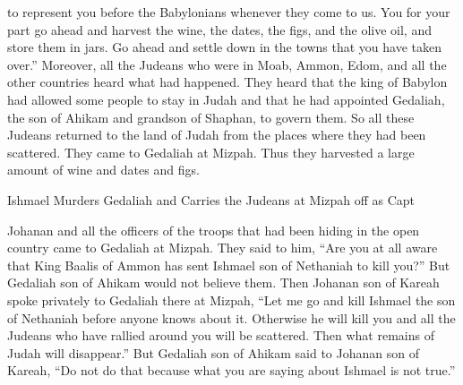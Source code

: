 {to represent
you before
the Babylonians
whenever they come
to
us. You
for your part go ahead and harvest
the wine,
the dates, the figs, and the olive oil,
and store
them in jars.
Go ahead and settle down
in the towns
that
you have taken over.”
Moreover,
all
the Judeans
who
were in Moab,
Ammon,
Edom,
and all
the other countries
heard
what had happened.
They heard that
the king
of Babylon
had allowed
some people
to stay
in Judah
and that
he had appointed
Gedaliah,
the son
of Ahikam
and grandson
of Shaphan, to govern them.
So all
these Judeans
returned
to the land
of Judah
from the places
where
they had been scattered.
They came
to
Gedaliah
at Mizpah.
Thus they harvested
a large amount
of wine
and dates and figs.
\par }{\SH Ishmael Murders Gedaliah and Carries the Judeans at Mizpah off as Capt
\par }{\PP {}Johanan
and all
the officers
of the troops
that had
been hiding in the open country
came
to
Gedaliah
at Mizpah.
They said
to
him, “Are you at all aware
that
King
Baalis
of Ammon
has sent
Ishmael
son
of Nethaniah
to kill
you?” But Gedaliah
son
of Ahikam
would not
believe them.
Then Johanan
son
of Kareah
spoke
privately
to
Gedaliah
there at Mizpah,
“Let
me go
and kill
Ishmael
the son
of Nethaniah
before anyone
knows
about it. Otherwise he will kill
you
and all
the Judeans
who have rallied around
you will be scattered.
Then what remains
of Judah
will disappear.”
But Gedaliah
son
of Ahikam
said to
Johanan
son
of Kareah,
“Do not
do
that because
what
you
are saying
about Ishmael
is not true.”

}
